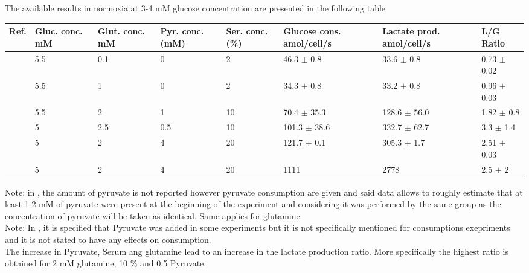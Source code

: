 \documentclass[11pt,a4paper]{article}
\begin{document}
The available results in normoxia at 3-4 mM glucose concentration are presented in the following table 

\begin{table}[h!]
\begin{center}
\begin{tabular}{ |p{7mm}|p{11mm}|p{11mm}|p{11mm}|p{11mm}|p{19mm}|p{21mm}|p{21mm}| }
 \hline
 \textbf{Ref.} & \textbf{Gluc. conc.}  mM & \textbf{Glut. conc.}  mM & \textbf{Pyr. conc}. (mM) &  \textbf{Ser. conc.}  (\%) & \textbf{Glucose cons.} amol/cell/s & \textbf{Lactate prod.} amol/cell/s& \textbf{L/G Ratio} \\
 \hline
 \cite{Otto2015} & 5.5  & 0.1 & 0 & 2 & 46.3 $\pm$ 0.8 & 33.6 $\pm$ 0.8 & 0.73 $\pm$ 0.02 \\
 \hline
  \cite{Otto2015} & 5.5 & 1 & 0 & 2 &  34.3 $\pm$ 0.8 & 33.2 $\pm$ 0.8  & 0.96 $\pm$ 0.03 \\
 \hline
   \cite{Bayar2021} & 5.5 & 2 & 1 & 10 & 70.4 $\pm$ 35.3 & 128.6 $\pm$ 56.0 & 1.82 $\pm$ 0.8 \\
 \hline %
    \cite{Bartmann2018} & 5 & 2.5 & 0.5 & 10 & 101.3 $\pm$ 38.6 & 332.7 $\pm$ 62.7 & 3.3 $\pm$ 1.4 \\
 \hline
     \cite{Mazurek1997} & 5 & 2 & 4 & 20 & 121.7 $\pm$ 0.1 & 305.3 $\pm$ 1.7 & 2.51 $\pm$ 0.03 \\
 \hline
      \cite{Hugo1992} & 5 & 2 & 4 & 20 & 1111 & 2778 & 2.5 $\pm$ 2 \\
 \hline
 \end{tabular}
\end{center}
\end{table}
Note: in \cite{Hugo1992}, the amount of pyruvate is not reported however pyruvate consumption are given and said data allows to roughly estimate that at least 1-2 mM of pyruvate were present at the beginning of the experiment and considering it was performed by the same group as \cite{Mazurek1997} the concentration of pyruvate will be taken as identical. Same applies for glutamine\\

Note: In \cite{Otto2015}, it is specified that Pyruvate was added in some experiments but it is not specifically mentioned for consumptions exepriments and it is not stated to have any effects on consumption.\\

The increase in Pyruvate, Serum ang glutamine lead to an increase in the lactate production ratio. More specifically the highest ratio is obtained  for 2 mM glutamine, 10 \% and 0.5 Pyruvate.
\end{document}
